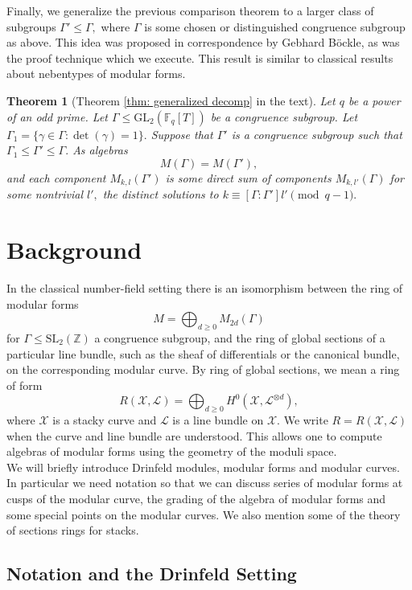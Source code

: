 \documentclass[11pt]{amsart}
\newtheorem{theorem}{Theorem}[section]
\theoremstyle{definition}
\numberwithin{equation}{section}
\newcommand{\GL}{\mathrm{GL}} 	%
\newcommand{\SL}{\mathrm{SL}} 	%
\newcommand{\sL}{\mathscr{L}}		%
\newcommand{\sX}{\mathscr{X}}		%
\newcommand{\bbF}{\mathbb{F}}		%
\newcommand{\bbZ}{\mathbb{Z}}		%
\begin{document}
		Finally, we generalize the previous comparison theorem to a larger class of subgroups $\Gamma'\leq \Gamma,$ where $\Gamma$ is some chosen or distinguished congruence subgroup as above. This idea was proposed in correspondence by Gebhard B\"ockle, as was the proof technique which we execute. This result is similar to classical results about nebentypes of modular forms. 
		\begin{theorem}[Theorem \ref{thm: generalized decomp} in the text]
			Let $q$ be a power of an odd prime. Let $\Gamma\leq \GL_2(\bbF_q[T])$ be a congruence subgroup. Let $\Gamma_1=\{\gamma\in \Gamma: \det(\gamma)=1\}.$ Suppose that $\Gamma'$ is a congruence subgroup such that $\Gamma_1\leq \Gamma'\leq \Gamma.$ As algebras
			\[M(\Gamma)=M(\Gamma'),\] and each component $M_{k,l}(\Gamma')$ is some direct sum of components $M_{k,l'}(\Gamma)$ for some nontrivial $l',$ the distinct solutions to $k\equiv [\Gamma:\Gamma']l'\pmod{q-1}.$
		\end{theorem}
		
		\section{Background} %
		
		In the classical number-field setting there is an isomorphism between the ring of modular forms 
		\[M = \bigoplus_{d\geq 0} M_{2d}(\Gamma)\]
		for $\Gamma\leq \SL_2(\bbZ)$ a congruence subgroup, and the ring of global sections of a particular line bundle, such as the sheaf of differentials or the canonical bundle, on the corresponding modular curve. By ring of global sections, we mean a ring of form 
		\[R(\sX,\sL)=\bigoplus_{d\geq 0}H^0(\sX,\sL^{\otimes d}),\]
		where $\sX$ is a stacky curve and $\sL$ is a line bundle on $\sX.$ We write $R=R(\sX,\sL)$ when the curve and line bundle are understood.
		This allows one to compute algebras of modular forms using the geometry of the moduli space.\\
		
		We will briefly introduce Drinfeld modules, modular forms and modular  curves. In particular we need notation so that we can discuss series of modular forms at cusps of the modular curve, the grading of the algebra of modular forms and some special points on the modular curves. We also mention some of the theory of sections rings for stacks.  
		
		\subsection{Notation and the Drinfeld Setting}
		
\end{document}

